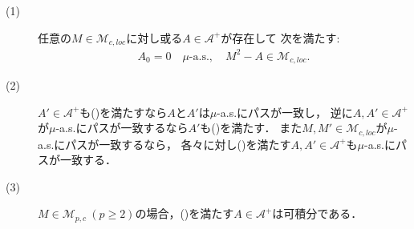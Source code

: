 	\begin{screen}
		\begin{thm}[二次変分の存在]\mbox{}
			\begin{description}
				\item[(1)]
					任意の$M \in \mathcal{M}_{c,loc}$に対し或る$A \in \mathcal{A}^+$が存在して
					次を満たす:
					\begin{align}
						A_0 = 0\quad \mbox{$\mu$-a.s.},
						\quad M^2 - A \in \mathcal{M}_{c,loc}.
						\label{eq:thm_existence_of_quadratic_variation_0}
					\end{align}
				\item[(2)]
					$A' \in \mathcal{A}^+$も()を満たすなら$A$と$A'$は$\mu$-a.s.にパスが一致し，
					逆に$A,A' \in \mathcal{A}^+$が$\mu$-a.s.にパスが一致するなら$A'$も()を満たす．
					また$M,M' \in \mathcal{M}_{c,loc}$が$\mu$-a.s.にパスが一致するなら，
					各々に対し()を満たす$A,A' \in \mathcal{A}^+$も$\mu$-a.s.にパスが一致する．
				\item[(3)]
					$M \in \mathcal{M}_{p,c}\ (p \geq 2)$の場合，()を満たす$A \in \mathcal{A}^+$は可積分である．
			\end{description}
			\label{thm:existence_of_quadratic_variation}
		\end{thm}
	\end{screen}
	
